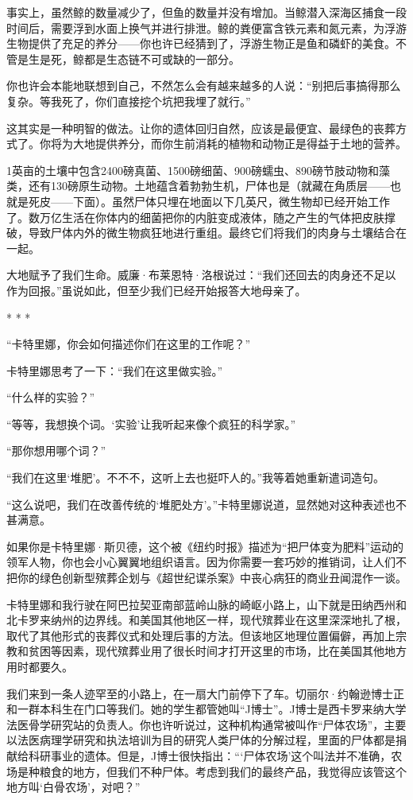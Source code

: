 \documentclass[12pt,oneside]{book}
\begin{document}
\begin{bookref}[frametitle={\cite{好好告别：世界葬礼观察手记}}]
事实上，虽然鲸的数量减少了，但鱼的数量并没有增加。当鲸潜入深海区捕食一段时间后，需要浮到水面上换气并进行排泄。鲸的粪便富含铁元素和氮元素，为浮游生物提供了充足的养分——你也许已经猜到了，浮游生物正是鱼和磷虾的美食。不管是生是死，鲸都是生态链不可或缺的一部分。

你也许会本能地联想到自己，不然怎么会有越来越多的人说：“别把后事搞得那么复杂。等我死了，你们直接挖个坑把我埋了就行。”

这其实是一种明智的做法。让你的遗体回归自然，应该是最便宜、最绿色的丧葬方式了。你将为大地提供养分，而你生前消耗的植物和动物正是得益于土地的营养。

1英亩的土壤中包含2400磅真菌、1500磅细菌、900磅蠕虫、890磅节肢动物和藻类，还有130磅原生动物。土地蕴含着勃勃生机，尸体也是（就藏在角质层——也就是死皮——下面）。虽然尸体只埋在地面以下几英尺，微生物却已经开始工作了。数万亿生活在你体内的细菌把你的内脏变成液体，随之产生的气体把皮肤撑破，导致尸体内外的微生物疯狂地进行重组。最终它们将我们的肉身与土壤结合在一起。

大地赋予了我们生命。威廉·布莱恩特·洛根说过：“我们还回去的肉身还不足以作为回报。”虽说如此，但至少我们已经开始报答大地母亲了。

\begin{center}
* * *
\end{center}

“卡特里娜，你会如何描述你们在这里的工作呢？”

卡特里娜思考了一下：“我们在这里做实验。”

“什么样的实验？”

“等等，我想换个词。‘实验’让我听起来像个疯狂的科学家。”

“那你想用哪个词？”

“我们在这里‘堆肥’。不不不，这听上去也挺吓人的。”我等着她重新遣词造句。

“这么说吧，我们在改善传统的‘堆肥处方’。”卡特里娜说道，显然她对这种表述也不甚满意。

如果你是卡特里娜·斯贝德，这个被《纽约时报》描述为“把尸体变为肥料”运动的领军人物，你也会小心翼翼地组织语言。因为你需要一套巧妙的推销词，让人们不把你的绿色创新型殡葬企划与《超世纪谍杀案》中丧心病狂的商业丑闻混作一谈。

卡特里娜和我行驶在阿巴拉契亚南部蓝岭山脉的崎岖小路上，山下就是田纳西州和北卡罗来纳州的边界线。和美国其他地区一样，现代殡葬业在这里深深地扎了根，取代了其他形式的丧葬仪式和处理后事的方法。但该地区地理位置偏僻，再加上宗教和贫困等因素，现代殡葬业用了很长时间才打开这里的市场，比在美国其他地方用时都要久。

我们来到一条人迹罕至的小路上，在一扇大门前停下了车。切丽尔·约翰逊博士正和一群本科生在门口等我们。她的学生都管她叫“J博士”。J博士是西卡罗来纳大学法医骨学研究站的负责人。你也许听说过，这种机构通常被叫作“尸体农场”，主要以法医病理学研究和执法培训为目的研究人类尸体的分解过程，里面的尸体都是捐献给科研事业的遗体。但是，J博士很快指出：“‘尸体农场’这个叫法并不准确，农场是种粮食的地方，但我们不种尸体。考虑到我们的最终产品，我觉得应该管这个地方叫‘白骨农场’，对吧？”


\end{bookref}
\end{document}
